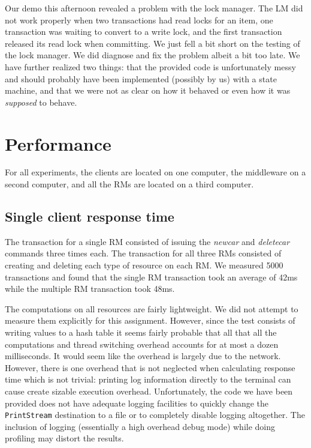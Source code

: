 \documentclass{article}
\begin{document}
Our demo this afternoon revealed a problem with the lock manager. The LM did not work properly when two transactions had read locks for an item, one transaction was waiting to convert to a write lock, and the first transaction released its read lock when committing. We just fell a bit short on the testing of the lock manager. We did diagnose and fix the problem albeit a bit too late. We have further realized two things: that the provided code is unfortunately messy and should probably have been implemented (possibly by us) with a state machine, and that we were not as clear on how it behaved or even how it was \textit{supposed} to behave. 


\section{Performance}

For all experiments, the clients are located on one computer, the middleware on a second computer, and all the RMs are located on a third computer.

\subsection{Single client response time}

The transaction for a single RM consisted of issuing the \textit{newcar} and \textit{deletecar} commands three times each. The transaction for all three RMs consisted of creating and deleting each type of resource on each RM. We measured 5000 transactions and found that the single RM transaction took an average of 42ms while the multiple RM transaction took 48ms. 

The computations on all resources are fairly lightweight. We did not attempt to measure them explicitly for this assignment. However, since the test consists of writing values to a hash table it seems fairly probable that all that all the computations and thread switching overhead accounts for at most a dozen milliseconds. It would seem like the overhead is largely due to the network. However, there is one overhead that is not neglected when calculating response time which is not trivial: printing log information directly to the terminal can cause create sizable execution overhead. Unfortunately, the code we have been provided does not have adequate logging facilities to quickly change the \texttt{PrintStream} destination to a file or to completely disable logging altogether. The inclusion of logging (essentially a high overhead debug mode) while doing profiling may distort the results.
\end{document}
